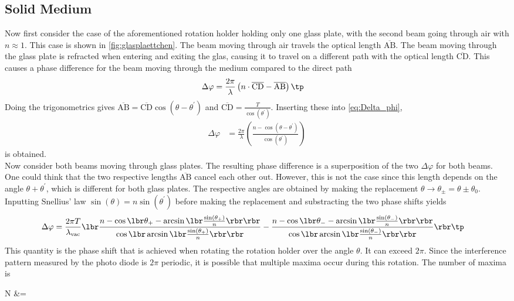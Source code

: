 \subsection{Solid Medium}
Now first consider the case of the aforementioned rotation holder holding only one glass plate, with the second beam going through air with $n \approx 1$. This case is shown in \autoref{fig:glasplaettchen}. The beam moving through air travels the optical length $\overline{\mathrm{AB}}$. The beam moving through the glass plate is refracted when entering and exiting the glas, causing it to travel on a different path with the optical length $\overline{\mathrm{CD}}$. This causes a phase difference for the beam moving through the medium compared to the direct path
\begin{align}
  \label{eq:Delta_phi}
  \Delta \varphi &= \frac{2\pi}{\lambda} \left( n \cdot \overline{\mathrm{CD}} - \overline{\mathrm{AB}}\right) \tp
\end{align}
Doing the trigonometrics gives $\overline{\mathrm{AB}} = \overline{\mathrm{CD}}\cos(\theta - \theta^\prime)$ and $\overline{\mathrm{CD}} = \frac{T}{\cos(\theta^\prime)}$. Inserting these into \autoref{eq:Delta_phi}, 
\begin{align}
  \Delta \varphi &= \frac{2\pi}{\lambda} \left( \frac{n - \cos(\theta - \theta^\prime)}{\cos(\theta^\prime)}\right)
\end{align}
is obtained.\\
Now consider both beams moving through glass plates. The resulting phase difference is a superposition  of the two $\Delta \varphi$ for both beams. One could think that the two respective lengths $\overline{\mathrm{AB}}$ cancel each other out. However, this is not the case since this length depends on the angle $\theta + \theta^\prime$, which is different for both glass plates. The respective angles are obtained by making the replacement $\theta \rightarrow \theta_\pm = \theta \pm \theta_0$. Inputting Snellius' law $\sin(\theta) = n \sin(\theta^\prime)$ before making the replacement and substracting the two phase shifts yields
\begin{align}
  \Delta \varphi &= \frac{2\pi T}{\lambda_\text{vac}} \lbr \frac{n - \cos\lbr\theta_+ - \arcsin\lbr \frac{\sin(\theta_+)}{n} \rbr \rbr}{\cos\lbr \arcsin\lbr\frac{\sin(\theta_+)}{n}\rbr \rbr} - \frac{n - \cos\lbr\theta_- - \arcsin\lbr \frac{\sin(\theta_-)}{n} \rbr\rbr}{\cos\lbr\arcsin\lbr\frac{\sin(\theta_-)}{n}\rbr\rbr}\rbr \tp
\end{align}
This quantity is the phase shift that is achieved when rotating the rotation holder over the angle $\theta$. It can exceed $2\pi$. Since the interference pattern measured by the photo diode is $2\pi$ periodic, it is possible that multiple maxima occur during this rotation. The number of maxima is 
\begin{aquation}
  N &= \frac{\Delta \varphi}{2\pi} \tp
\end{aquation}

